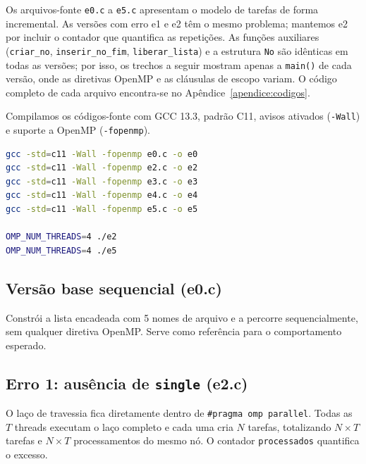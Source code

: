 \documentclass[11pt,letterpaper]{article}
\begin{document}
Os arquivos-fonte \texttt{e0.c} a \texttt{e5.c} apresentam o modelo de tarefas de forma incremental. As versões com erro e1 e e2 têm o mesmo problema; mantemos e2 por incluir o contador que quantifica as repetições. As fun\c c\~oes auxiliares (\texttt{criar\_no}, \texttt{inserir\_no\_fim}, \texttt{liberar\_lista}) e a estrutura \texttt{No} s\~ao id\^enticas em todas as vers\~oes; por isso, os trechos a seguir mostram apenas a \texttt{main()} de cada vers\~ao, onde as diretivas OpenMP e as cl\'ausulas de escopo variam. O c\'odigo completo de cada arquivo encontra-se no Ap\^endice~\ref{apendice:codigos}.

Compilamos os códigos-fonte com GCC 13.3, padrão C11, avisos ativados (\texttt{-Wall}) e suporte a OpenMP (\texttt{-fopenmp}).

\begin{lstlisting}[language=bash, caption={Compilação e execução dos programas}]
gcc -std=c11 -Wall -fopenmp e0.c -o e0
gcc -std=c11 -Wall -fopenmp e2.c -o e2
gcc -std=c11 -Wall -fopenmp e3.c -o e3
gcc -std=c11 -Wall -fopenmp e4.c -o e4
gcc -std=c11 -Wall -fopenmp e5.c -o e5

OMP_NUM_THREADS=4 ./e2
OMP_NUM_THREADS=4 ./e5
\end{lstlisting}

\subsection{Versão base sequencial (e0.c)}
Constrói a lista encadeada com 5 nomes de arquivo e a percorre sequencialmente, sem qualquer diretiva OpenMP. Serve como referência para o comportamento esperado.



\subsection{Erro 1: ausência de \texttt{single} (e2.c)}
O laço de travessia fica diretamente dentro de \texttt{\#pragma omp parallel}. Todas as $T$ threads executam o laço completo e cada uma cria $N$ tarefas, totalizando $N \times T$ tarefas e $N \times T$ processamentos do mesmo nó. O contador \texttt{processados} quantifica o excesso.
\end{document}
